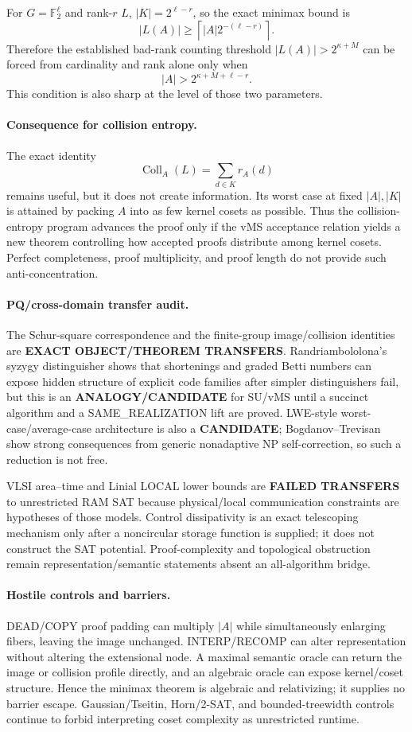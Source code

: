 \documentclass[11pt]{article}
\begin{document}
For $G=\mathbb F_2^\ell$ and rank-$r$ $L$, $|K|=2^{\ell-r}$, so the exact minimax bound is
\[
|L(A)|\ge\left\lceil |A|2^{-(\ell-r)}\right\rceil.
\]
Therefore the established bad-rank counting threshold $|L(A)|>2^{\kappa+M}$ can be forced from cardinality and rank alone only when
\[
\boxed{|A|>2^{\kappa+M+\ell-r}.}
\]
This condition is also sharp at the level of those two parameters.

\paragraph{Consequence for collision entropy.}
The exact identity
\[
\operatorname{Coll}_A(L)=\sum_{d\in K}r_A(d)
\]
remains useful, but it does not create information. Its worst case at fixed $|A|,|K|$ is attained by packing $A$ into as few kernel cosets as possible. Thus the collision-entropy program advances the proof only if the vMS acceptance relation yields a new theorem controlling how accepted proofs distribute among kernel cosets. Perfect completeness, proof multiplicity, and proof length do not provide such anti-concentration.

\paragraph{PQ/cross-domain transfer audit.}
The Schur-square correspondence and the finite-group image/collision identities are \textbf{EXACT OBJECT/THEOREM TRANSFERS}. Randriambololona's syzygy distinguisher shows that shortenings and graded Betti numbers can expose hidden structure of explicit code families after simpler distinguishers fail, but this is an \textbf{ANALOGY/CANDIDATE} for SU/vMS until a succinct algorithm and a SAME\_REALIZATION lift are proved. LWE-style worst-case/average-case architecture is also a \textbf{CANDIDATE}; Bogdanov--Trevisan show strong consequences from generic nonadaptive NP self-correction, so such a reduction is not free.

VLSI area--time and Linial LOCAL lower bounds are \textbf{FAILED TRANSFERS} to unrestricted RAM SAT because physical/local communication constraints are hypotheses of those models. Control dissipativity is an exact telescoping mechanism only after a noncircular storage function is supplied; it does not construct the SAT potential. Proof-complexity and topological obstruction remain representation/semantic statements absent an all-algorithm bridge.

\paragraph{Hostile controls and barriers.}
DEAD/COPY proof padding can multiply $|A|$ while simultaneously enlarging fibers, leaving the image unchanged. INTERP/RECOMP can alter representation without altering the extensional node. A maximal semantic oracle can return the image or collision profile directly, and an algebraic oracle can expose kernel/coset structure. Hence the minimax theorem is algebraic and relativizing; it supplies no barrier escape. Gaussian/Tseitin, Horn/2-SAT, and bounded-treewidth controls continue to forbid interpreting coset complexity as unrestricted runtime.
\end{document}
